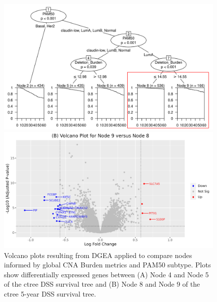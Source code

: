 \begin{figure}[H]
\begin{center}
\begin{multicols}{2}
\end{multicols}
\begin{multicols}{2}    
	\includegraphics[width=1\linewidth]{../figures/Chapter_4/Ctree_Survival_Burden_FiveYearDSS_PAM50_Ann.png}\par 
    \includegraphics[width=1\linewidth]{../figures/Chapter_4/Volcano_2.png}\par 

\end{multicols}
\caption[Volcano plots resulting from DGEA applied to compare nodes informed by global CNA Burden metrics and PAM50 subtype.]{Volcano plots resulting from DGEA applied to compare nodes informed by global CNA Burden metrics and PAM50 subtype. Plots show differentially expressed genes between (A) Node 4 and Node 5 of the ctree DSS survival tree and (B) Node 8 and Node 9 of the ctree 5-year DSS survival tree.}
\label{fig:DGEA_Global_VP_PAM50}
\end{center}
\end{figure}
\vfill 

